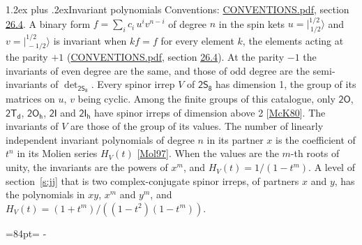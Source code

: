 \documentclass[10pt,a4paper]{article}
\makeatletter
\renewcommand\section{\@startsection{section}{1}{\z@}{-3ex plus -1ex minus -.2ex}%
  {1.2ex plus .2ex}{\normalfont\large\sffamily\bfseries\color{parttitle}}}
\newcommand{\needspace}[1]{\par\penalty-100\begingroup\dimen0=#1\relax\dimen2=\pagegoal
  \advance\dimen2-\pagetotal\ifdim\dimen0>\dimen2\relax\ifdim\dimen2>0pt\vfil\break\fi\fi
  \endgroup}
\numberwithin{equation}{section}
\newcommand{\grp}[1]{\mathsf{#1}}
\newcommand{\jm}[2]{\bigl\lvert{}^{#1}_{\,#2}\bigr\rangle}
\makeatother
\begin{document}
\section{Invariant polynomials}\label{s:invariants}
Conventions: \href{../../CONVENTIONS.pdf}{CONVENTIONS.pdf}, section \href{../../CONVENTIONS.pdf\#conv.26.4}{26.4}.
\leavevmode\label{n:local.binary.form}A binary form $f = \sum_i c_i\, u^i v^{n-i}$ of degree $n$ in the spin kets $u = \jm{1/2}{1/2}$ and $v = \jm{1/2}{-1/2}$ is invariant when $k f = f$ for every element $k$, the elements acting at the parity $+1$ (\href{../../CONVENTIONS.pdf}{CONVENTIONS.pdf}, section \href{../../CONVENTIONS.pdf\#conv.26.4}{26.4}). At the parity $-1$ the invariants of even degree are the same, and those of odd degree are the semi-invariants of $\det_{\grp{2S_{8}}}$.
\leavevmode\label{n:function.hilbert}Every spinor irrep $V$ of $\grp{2S_{8}}$ has dimension 1, the group of its matrices on $u$, $v$ being cyclic. Among the finite groups of this catalogue, only $\grp{2O}$, $\grp{2T_{d}}$, $\grp{2O_{h}}$, $\grp{2I}$ and $\grp{2I_{h}}$ have spinor irreps of dimension above 2 [\href{../../../REFERENCES.pdf\#ref.McK80}{McK80}]. The invariants of $V$ are those of the group of its values. \label{n:local.partner.x}The number of linearly independent invariant polynomials of degree $n$ in its partner $x$ is the coefficient of $t^n$ in its Molien series $H_V(t)$ [\href{../../../REFERENCES.pdf\#ref.Mol97}{Mol97}]. When the values are the $m$-th roots of unity, the invariants are the powers of $x^{m}$, and $H_V(t) = 1/(1 - t^{m})$. A level of section~\ref{s:jj} that is two complex-conjugate spinor irreps, of partners $x$ and $y$, has the polynomials in $xy$, $x^{m}$ and $y^{m}$, and $H_V(t) = (1 + t^{m})/((1 - t^{2})(1 - t^{m}))$.
\needspace{84pt}
\end{document}
